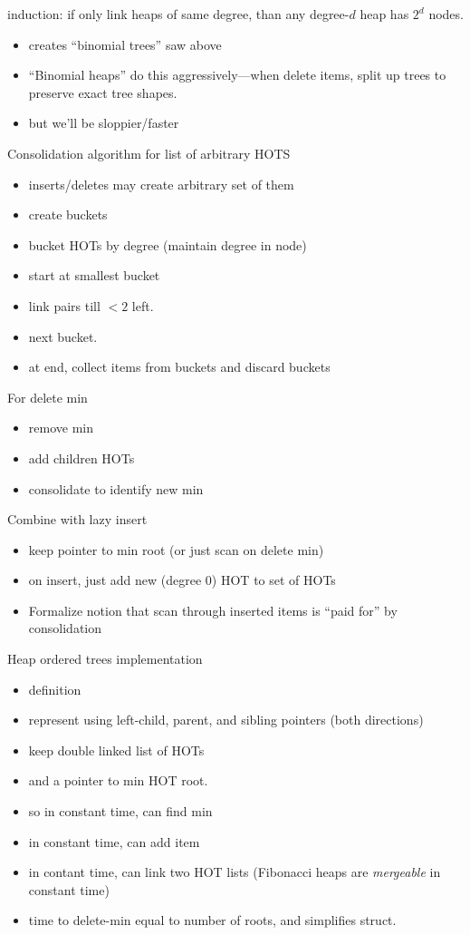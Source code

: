 \documentclass{article}
\begin{document}
induction: if only link heaps of same degree, than any degree-$d$
  heap has $2^{d}$ nodes.
\begin{itemize}
\item creates ``binomial trees'' saw above
\item ``Binomial heaps'' do this aggressively---when delete items,
  split up trees to preserve exact tree shapes.
\item but we'll be sloppier/faster
\end{itemize}

Consolidation algorithm for list of arbitrary HOTS
\begin{itemize}
\item inserts/deletes may create arbitrary set of them
\item create buckets
\item bucket HOTs by degree (maintain degree in node)
\item start at smallest bucket
\item link pairs till $<2$ left.  
\item next bucket.
\item at end, collect items from buckets and discard buckets
\end{itemize}

For delete min
\begin{itemize}
\item remove min
\item add children HOTs
\item consolidate to identify new min
\end{itemize}

Combine with lazy insert
\begin{itemize}
\item keep pointer to min root (or just scan on delete min)
\item on insert, just add new (degree 0) HOT to set of HOTs
\item Formalize notion that scan through inserted items is ``paid
  for'' by consolidation
\end{itemize}

Heap ordered trees implementation
\begin{itemize}
\item definition
\item represent using left-child, parent, and sibling pointers (both directions)
\item keep double linked list of HOTs
\item and a pointer to min HOT root.
\item so in constant time, can find min
\item in constant time, can add item
\item in contant time, can link two HOT lists (Fibonacci heaps are
  \emph{mergeable} in constant time)
\item time to delete-min equal to number of roots, and simplifies struct.
\end{itemize}
\end{document}
